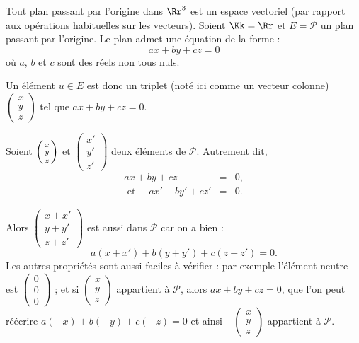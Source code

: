 \documentclass[class=report,crop=false]{standalone}
\begin{document}
\begin{exemple}
Tout plan passant par l'origine dans $\Rr^3$ est un espace vectoriel
(par rapport aux opérations habituelles sur les vecteurs).
Soient $\Kk=\Rr$ et $E=\mathcal{P}$ un plan passant par l'origine. Le plan admet une équation de la forme :
$$ax + by + cz = 0$$
où $a$, $b$ et $c$ sont des réels non tous nuls.



Un élément $u\in E$ est donc un triplet (noté ici comme un vecteur colonne)
$\left(\begin{smallmatrix}x\\ y\\ z\end{smallmatrix}\right)$ tel que
$ax + by + cz = 0$.

Soient $\left(\begin{smallmatrix}\vphantom{x'}x\\\vphantom{y'} y\\\vphantom{z'} z\end{smallmatrix}\right)$ et
$\left(\begin{smallmatrix}x'\\ y'\\ z'\end{smallmatrix}\right)$ deux éléments
de $\mathcal{P}$.
Autrement dit,
$$\begin{array}{rcl}
a x + b y + c z & = & 0,\\
\text{ et } \quad a x' + b y' + c z' & = & 0.
\end{array}$$

Alors $\left(\begin{smallmatrix}x + x'\\ y + y'\\ z + z'\end{smallmatrix}\right)$
est aussi dans $\mathcal{P}$ car on a bien :
$$a (x + x') + b(y + y') + c (z + z') = 0.$$
Les autres propriétés sont aussi faciles à vérifier :
par exemple l'élément neutre est $\left(\begin{smallmatrix}0\\ 0\\ 0\end{smallmatrix}\right)$  ; et si $\left(\begin{smallmatrix}x\\ y\\ z\end{smallmatrix}\right)$ appartient à
$\mathcal{P}$, alors $a x + b y + c z  =  0$,
que l'on peut réécrire $a(-x)+b(-y)+c(-z)=0$ et ainsi
$-\left(\begin{smallmatrix}x\\ y\\ z\end{smallmatrix}\right)$ appartient à
$\mathcal{P}$.



\end{exemple}
\end{document}
